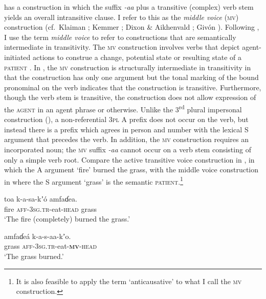\documentclass[output=paper]{langsci/langscibook}
\begin{document}
 has a construction in which the suffix \textit{{}-aa }plus a transitive (complex) verb stem yields an overall intransitive clause. I refer to this as the \textit{middle voice} (\textsc{mv}) construction (cf.\ Klaiman \citeyear[44-45]{Klaiman1991}; Kemmer \citeyear[3-4]{Kemmer1993}; Dixon \& Aikhenvald \citeyear[12]{DixonAikhenvald2000}; Giv\'on \citeyear[116-121]{Givon2001}). Following \citet[3]{Kemmer1993}, I use the term \textit{middle voice} to refer to constructions that are semantically intermediate in transitivity. The \textsc{ mv} construction involves verbs that depict agent-initiated actions to construe a change, potential state or resulting state of a \textsc{patient} \citep[cf.][116]{Givon2001}. In , the \textsc{mv }construction is structurally intermediate in transitivity in that the construction has only one argument but the tonal marking of the bound pronominal on the verb indicates that the construction is transitive. Furthermore, though the verb stem is transitive, the construction does not allow expression of the \textsc{agent} in an agent phrase or otherwise. Unlike the 3\textsuperscript{rd} plural impersonal construction (), a non-referential 3\textsc{pl} A prefix does not occur on the verb, but instead there is a prefix which agrees in person and number with the lexical S argument that precedes the verb. In addition, the  \textsc{mv} construction requires an incorporated noun; the \textsc{mv} suffix \textit{{}-aa} cannot occur on a verb stem consisting of only a simple verb root. Compare the active transitive voice construction in , in which the A argument ‘fire’ burned the grass, with the middle voice construction in  where the S argument ‘grass’ is the semantic \textsc{patient}.\footnote{It is also feasible to apply the term ‘anticausative’ \citep[cf.][7]{DixonAikhenvald2000} to what I call the \textsc{mv }construction.}  

\ea\label{ex:ahlandc:47}
\gll
toa    k-a-sa-kʼ\'{o}  amfaɗea. \\
fire  \textsc{aff-3sg.tr-}eat\textsc{{}-head}  grass \\  
\glt
‘The fire (completely) burned the grass.’  
\z

\ea\label{ex:ahlandc:48}
\gll
amfaɗeá k-a-s-aa-kʼo. \\
grass       \textsc{aff-3sg.tr}{}-eat-\textbf{\textsc{mv}}\textsc{{}-head} \\
\glt
‘The grass burned.’
\z
\end{document}
